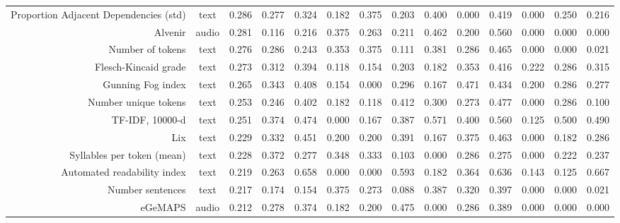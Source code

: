 \begin{tabular}{rc||ccc||ccc||ccc||ccc}
 Proportion Adjacent Dependencies (std) &     text &              0.286 &      0.277 & 0.324 &    0.182 &      0.375 & 0.203 &     0.400 &      0.000 & 0.419 &     0.000 &      0.250 & 0.216 \\
                                Alvenir &    audio &              0.281 &      0.116 & 0.216 &    0.375 &      0.263 & 0.211 &     0.462 &      0.200 & 0.560 &     0.000 &      0.000 & 0.000 \\
                       Number of tokens &     text &              0.276 &      0.286 & 0.243 &    0.353 &      0.375 & 0.111 &     0.381 &      0.286 & 0.465 &     0.000 &      0.000 & 0.021 \\
                   Flesch-Kincaid grade &     text &              0.273 &      0.312 & 0.394 &    0.118 &      0.154 & 0.203 &     0.182 &      0.353 & 0.416 &     0.222 &      0.286 & 0.315 \\
                      Gunning Fog index &     text &              0.265 &      0.343 & 0.408 &    0.154 &      0.000 & 0.296 &     0.167 &      0.471 & 0.434 &     0.200 &      0.286 & 0.277 \\
                   Number unique tokens &     text &              0.253 &      0.246 & 0.402 &    0.182 &      0.118 & 0.412 &     0.300 &      0.273 & 0.477 &     0.000 &      0.286 & 0.100 \\
                        TF-IDF, 10000-d &     text &              0.251 &      0.374 & 0.474 &    0.000 &      0.167 & 0.387 &     0.571 &      0.400 & 0.560 &     0.125 &      0.500 & 0.490 \\
                                    Lix &     text &              0.229 &      0.332 & 0.451 &    0.200 &      0.200 & 0.391 &     0.167 &      0.375 & 0.463 &     0.000 &      0.182 & 0.286 \\
             Syllables per token (mean) &     text &              0.228 &      0.372 & 0.277 &    0.348 &      0.333 & 0.103 &     0.000 &      0.286 & 0.275 &     0.000 &      0.222 & 0.237 \\
            Automated readability index &     text &              0.219 &      0.263 & 0.658 &    0.000 &      0.000 & 0.593 &     0.182 &      0.364 & 0.636 &     0.143 &      0.125 & 0.667 \\
                       Number sentences &     text &              0.217 &      0.174 & 0.154 &    0.375 &      0.273 & 0.088 &     0.387 &      0.320 & 0.397 &     0.000 &      0.000 & 0.021 \\
                                eGeMAPS &    audio &              0.212 &      0.278 & 0.374 &    0.182 &      0.200 & 0.475 &     0.000 &      0.286 & 0.389 &     0.000 &      0.000 & 0.000 \\

\end{tabular}
